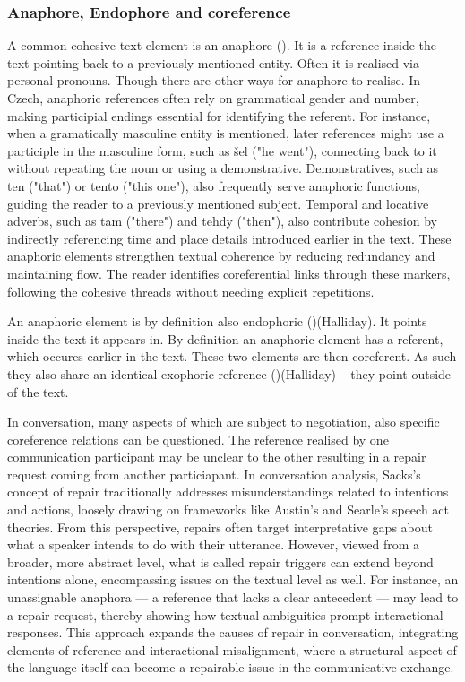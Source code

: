 \documentclass[12pt]{report}
\begin{document}
{\subsubsection{Anaphore, Endophore and coreference}
\par
    A common cohesive text element is an anaphore ().
    It is a reference inside the text pointing back to a previously mentioned entity.
    Often it is realised via personal pronouns.
    Though there are other ways for anaphore to realise.
    In Czech, anaphoric references often rely on grammatical gender and number,
    making participial endings essential for identifying the referent.
    For instance, when a gramatically masculine entity is mentioned,
    later references might use a participle in the masculine form, such as šel ("he went"),
    connecting back to it without repeating the noun or using a demonstrative.
    Demonstratives, such as ten ("that") or tento ("this one"),
    also frequently serve anaphoric functions, guiding the reader to a previously mentioned subject.
    Temporal and locative adverbs, such as tam ("there") and tehdy ("then"),
    also contribute cohesion by indirectly referencing time and place details introduced earlier in the text.
    These anaphoric elements strengthen textual coherence by reducing redundancy and maintaining flow.
    The reader identifies coreferential links through these markers,
    following the cohesive threads without needing explicit repetitions.

\par
    An anaphoric element is by definition also endophoric ()(Halliday).
    It points inside the text it appears in.
    By definition an anaphoric element has a referent, which occures earlier in the text.
    These two elements are then coreferent.
    As such they also share an identical exophoric reference ()(Halliday) – they point outside of the text.

\par
    In conversation, many aspects of which are subject to negotiation,
    also specific coreference relations can be questioned.
    The reference realised by one communication participant may be unclear to the other
    resulting in a repair request coming from another particiapant.
    In conversation analysis,
    Sacks’s concept of repair traditionally addresses
    misunderstandings related to intentions and actions,
    loosely drawing on frameworks like Austin’s and Searle’s speech act theories.
    From this perspective, repairs often target interpretative gaps about
    what a speaker intends to do with their utterance.
    However, viewed from a broader, more abstract level,
    what is called repair triggers can extend beyond intentions alone,
    encompassing issues on the textual level as well.
    For instance, an unassignable anaphora —
    a reference that lacks a clear antecedent —
    may lead to a repair request,
    thereby showing how textual ambiguities prompt interactional responses.
    This approach expands the causes of repair in conversation,
    integrating elements of reference and interactional misalignment,
    where a structural aspect of the language itself can
    become a repairable issue in the communicative exchange.

}
\end{document}
